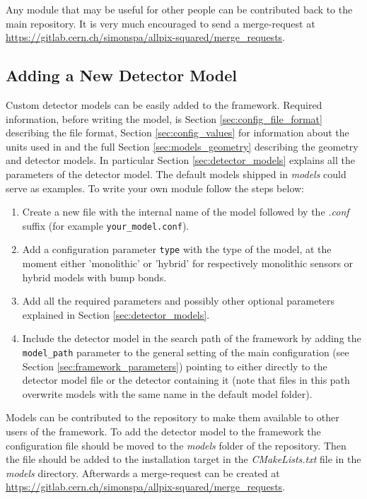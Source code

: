 Any module that may be useful for other people can be contributed back to the main repository. It is very much encouraged to send a merge-request at \url{https://gitlab.cern.ch/simonspa/allpix-squared/merge_requests}.

\subsection{Adding a New Detector Model}
\label{sec:adding_detector_model}
Custom detector models can be easily added to the framework. Required information, before writing the model, is Section \ref{sec:config_file_format} describing the file format, Section \ref{sec:config_values} for information about the units used in \apsq and the full Section \ref{sec:models_geometry} describing the geometry and detector models. In particular Section \ref{sec:detector_models} explains all the parameters of the detector model. The default models shipped in \textit{models} could serve as examples. To write your own module follow the steps below:
\begin{enumerate}
\item Create a new file with the internal name of the model followed by the \textit{.conf} suffix (for example \texttt{your\_model.conf}).
\item Add a configuration parameter \texttt{type} with the type of the model, at the moment either 'monolithic' or 'hybrid' for respectively monolithic sensors or hybrid models with bump bonds.
\item Add all the required parameters and possibly other optional parameters explained in Section \ref{sec:detector_models}.
\item Include the detector model in the search path of the framework by adding the \texttt{model\_path} parameter to the general setting of the main configuration (see Section \ref{sec:framework_parameters}) pointing to either directly to the detector model file or the detector containing it (note that files in this path overwrite models with the same name in the default model folder).
\end{enumerate}

Models can be contributed to the repository to make them available to other users of the framework. To add the detector model to the framework the configuration file should be moved to the \textit{models} folder of the repository. Then the file should be added to the installation target in the \textit{CMakeLists.txt} file in the \textit{models} directory. Afterwards a merge-request can be created at \url{https://gitlab.cern.ch/simonspa/allpix-squared/merge_requests}.

